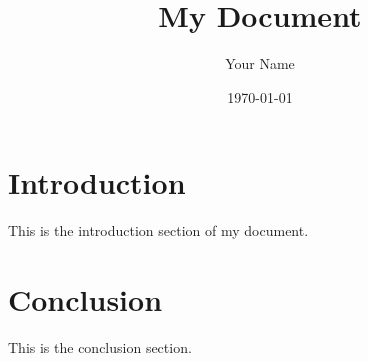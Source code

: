 \documentclass{article}
\begin{document}
\title{My Document}
\author{Your Name}
\date{\today}

\maketitle

\section{Introduction}
This is the introduction section of my document.

\section{Conclusion}
This is the conclusion section.
\end{document}
